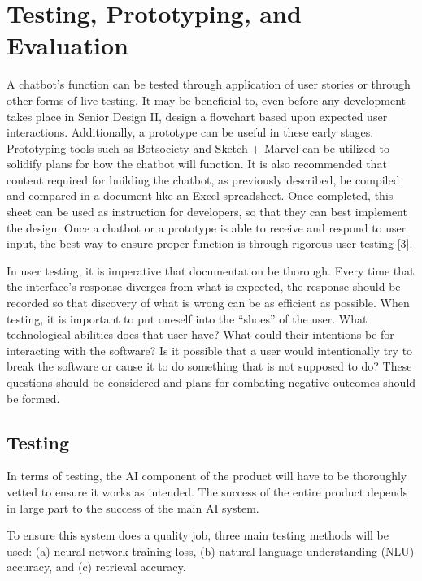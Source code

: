 \documentclass[titlepage, 12pt]{article}
\begin{document}
\pagebreak



\section{Testing, Prototyping, and Evaluation}

A chatbot’s function can be tested through application of user stories or through other forms of live testing. It may be beneficial to, even before any development takes place in Senior Design II, design a flowchart based upon expected user interactions. Additionally, a prototype can be useful in these early stages. Prototyping tools such as Botsociety and Sketch + Marvel can be utilized to solidify plans for how the chatbot will function. It is also recommended that content required for building the chatbot, as previously described, be compiled and compared in a document like an Excel spreadsheet. Once completed, this sheet can be used as instruction for developers, so that they can best implement the design. Once a chatbot or a prototype is able to receive and respond to user input, the best way to ensure proper function is through rigorous user testing [3].
 
In user testing, it is imperative that documentation be thorough. Every time that the interface’s response diverges from what is expected, the response should be recorded so that discovery of what is wrong can be as efficient as possible. When testing, it is important to put oneself into the “shoes” of the user. What technological abilities does that user have? What could their intentions be for interacting with the software? Is it possible that a user would intentionally try to break the software or cause it to do something that is not supposed to do? These questions should be considered and plans for combating negative outcomes should be formed.

\subsection{Testing}

In terms of testing, the AI component of the product will have to be thoroughly vetted to ensure it works as intended. The success of the entire product depends in large part to the success of the main AI system.

To ensure this system does a quality job, three main testing methods will be used: (a) neural network training loss, (b) natural language understanding (NLU) accuracy, and (c) retrieval accuracy.
\end{document}
